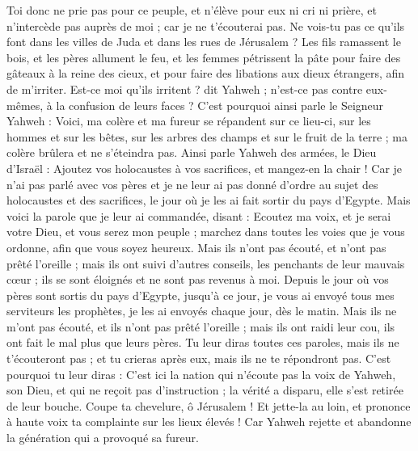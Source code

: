 \begin{multicols}{2}
Toi donc ne prie pas pour ce peuple, et n'élève pour eux ni cri ni prière, et n'intercède pas auprès de moi ; car je ne t'écouterai pas.
Ne vois-tu pas ce qu'ils font dans les villes de Juda et dans les rues de Jérusalem ?
Les fils ramassent le bois, et les pères allument le feu, et les femmes pétrissent la pâte pour faire des gâteaux à la reine des cieux, et pour faire des libations aux dieux étrangers, afin de m'irriter.
Est-ce moi qu'ils irritent ? dit Yahweh ; n'est-ce pas contre eux-mêmes, à la confusion de leurs faces ?
C'est pourquoi ainsi parle le Seigneur Yahweh : Voici, ma colère et ma fureur se répandent sur ce lieu-ci, sur les hommes et sur les bêtes, sur les arbres des champs et sur le fruit de la terre ; ma colère brûlera et ne s'éteindra pas.
Ainsi parle Yahweh des armées, le Dieu d'Israël : Ajoutez vos holocaustes à vos sacrifices, et mangez-en la chair !
Car je n'ai pas parlé avec vos pères et je ne leur ai pas donné d'ordre au sujet des holocaustes et des sacrifices, le jour où je les ai fait sortir du pays d'Egypte.
Mais voici la parole que je leur ai commandée, disant : Ecoutez ma voix, et je serai votre Dieu, et vous serez mon peuple ; marchez dans toutes les voies que je vous ordonne, afin que vous soyez heureux.
Mais ils n'ont pas écouté, et n'ont pas prêté l'oreille ; mais ils ont suivi d'autres conseils, les penchants de leur mauvais cœur ; ils se sont éloignés et ne sont pas revenus à moi.
Depuis le jour où vos pères sont sortis du pays d'Egypte, jusqu'à ce jour, je vous ai envoyé tous mes serviteurs les prophètes, je les ai envoyés chaque jour, dès le matin.
Mais ils ne m'ont pas écouté, et ils n'ont pas prêté l'oreille ; mais ils ont raidi leur cou, ils ont fait le mal plus que leurs pères.
Tu leur diras toutes ces paroles, mais ils ne t'écouteront pas ; et tu crieras après eux, mais ils ne te répondront pas.
C'est pourquoi tu leur diras : C'est ici la nation qui n'écoute pas la voix de Yahweh, son Dieu, et qui ne reçoit pas d'instruction ; la vérité a disparu, elle s'est retirée de leur bouche.
Coupe ta chevelure, ô Jérusalem ! Et jette-la au loin, et prononce à haute voix ta complainte sur les lieux élevés ! Car Yahweh rejette et abandonne la génération qui a provoqué sa fureur.

\end{multicols}
